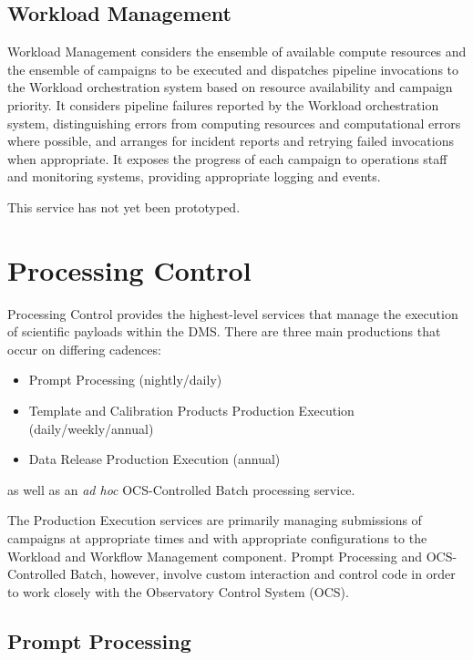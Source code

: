 \documentclass[DM,toc]{lsstdoc}
\begin{document}
\subsection{Workload Management}\label{workload-management}

Workload Management considers the ensemble of available compute resources and
the ensemble of campaigns to be executed and dispatches pipeline invocations to
the Workload orchestration system based on resource availability and campaign
priority.  It considers pipeline failures reported by the Workload
orchestration system, distinguishing errors from computing resources and
computational errors where possible, and arranges for incident reports and
retrying failed invocations when appropriate.  It exposes the progress of each
campaign to operations staff and monitoring systems, providing appropriate
logging and events.

This service has not yet been prototyped.


\section{Processing Control}\label{processing-control}

Processing Control provides the highest-level services that manage the
execution of scientific payloads within the DMS.  There are three main
productions that occur on differing cadences:
\begin{itemize}
	\item Prompt Processing (nightly/daily)
	\item Template and Calibration Products Production Execution (daily/weekly/annual)
	\item Data Release Production Execution (annual)
\end{itemize}
as well as an \textit{ad hoc} OCS-Controlled Batch processing service.

The Production Execution services are primarily managing submissions of
campaigns at appropriate times and with appropriate configurations to the
Workload and Workflow Management component.  Prompt Processing and
OCS-Controlled Batch, however, involve custom interaction and control code in
order to work closely with the Observatory Control System (OCS).

\subsection{Prompt Processing}\label{prompt-processing}
\end{document}
